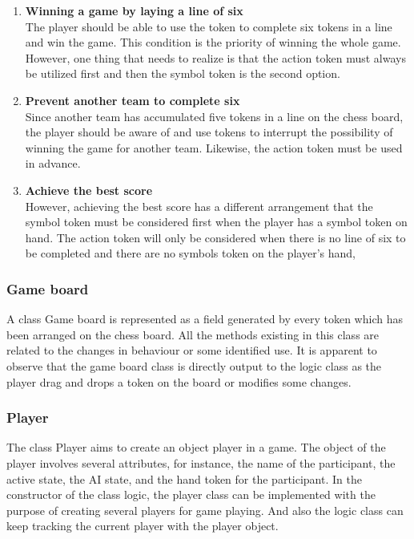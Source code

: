 \begin{enumerate}
	\item\textbf{Winning a game by laying a line of six}\\
    The player should be able to use the token to complete six tokens in a line and win the game. 
This condition is the priority of winning the whole game. However, one thing that needs to realize is that the action token must always be utilized first and then the symbol token is the second option. 
	\item\textbf{Prevent another team to complete six}\\
Since another team has accumulated five tokens in a line on the chess board, the player should be aware of and use tokens to interrupt the possibility of winning the game for another team. Likewise, the action token must be used in advance. 
	\item\textbf{Achieve the best score}\\
	However, achieving the best score has a different arrangement that the symbol token must be considered first when the player has a symbol token on hand. The action token will only be considered when there is no line of six to be completed and there are no symbols token on the player's hand, 
	
\end{enumerate}



\subsubsection{Game board}

A class Game board is represented as a field generated by every token which has been arranged on the chess board. All the methods existing in this class are related to the changes in behaviour or some identified use. It is apparent to observe that the game board class is directly output to the logic class as the player drag and drops a token on the board or modifies some changes. 

\subsubsection{Player}

The class Player aims to create an object player in a game. The object of the player involves several attributes, for instance, the name of the participant, the active state, the AI state, and the hand token for the participant. 
In the constructor of the class logic, the player class can be implemented with the purpose of creating several players for game playing. And also the logic class can keep tracking the current player with the player object.    

